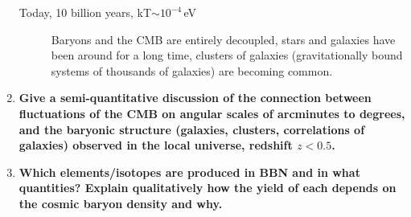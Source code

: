 \documentclass[12pt, letterpaper, preprint]{aastex}
\begin{document}
\begin{enumerate}
\begin{description}
\item[Today, 10 billion years, kT$\sim 10^{-4}$\,eV] Baryons and the CMB are entirely decoupled, stars and galaxies have been around for a long time, clusters of galaxies (gravitationally bound systems of thousands of galaxies) are becoming common. 

\end{description}

\item \textbf{Give a semi-quantitative discussion of the connection between fluctuations of the CMB on angular scales of arcminutes to degrees, and the baryonic structure (galaxies, clusters, correlations of galaxies) observed in the local universe, redshift $z < 0.5$.}

\item \textbf{Which elements/isotopes are produced in BBN and in what quantities? Explain qualitatively how the yield of each depends on the cosmic baryon density and why.}

\end{enumerate}
\end{document}
